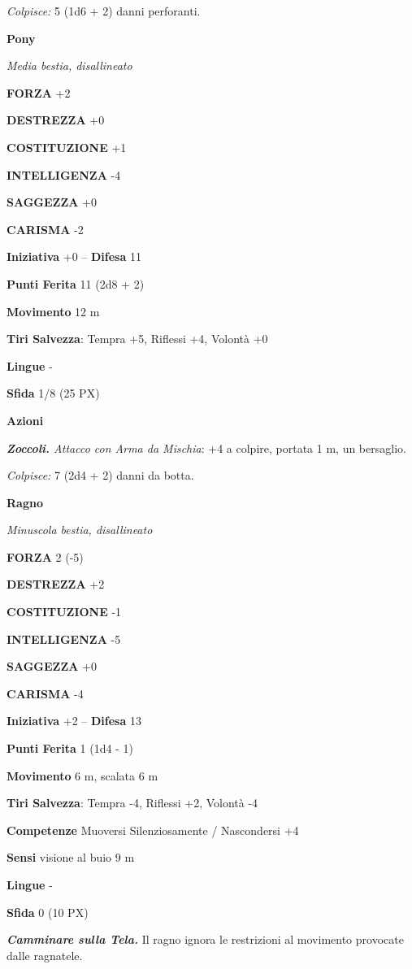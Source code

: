 \begin{multicols}{2}
	\textit{Colpisce:} 5 (1d6 + 2) danni perforanti.


	\medskip\textbf{Pony}

	\textit{Media bestia, disallineato}

	\textbf{FORZA} +2

	\textbf{DESTREZZA} +0

	\textbf{COSTITUZIONE} +1

	\textbf{INTELLIGENZA} -4

	\textbf{SAGGEZZA} +0

	\textbf{CARISMA} -2

	\textbf{Iniziativa} +0 -- \textbf{Difesa} 11

	\textbf{Punti Ferita} 11 (2d8 + 2)

	\textbf{Movimento} 12 m

	\textbf{Tiri Salvezza}: Tempra +5, Riflessi +4, Volontà +0

	\textbf{Lingue} -

	\textbf{Sfida} 1/8 (25 PX)

	\textbf{Azioni}

	\textit{\textbf{Zoccoli.} Attacco con Arma da Mischia}: +4 a colpire, portata 1 m, un bersaglio.

	\textit{Colpisce:} 7 (2d4 + 2) danni da botta.

	\medskip\textbf{Ragno}

	\textit{Minuscola bestia, disallineato}

	\textbf{FORZA} 2 (-5)

	\textbf{DESTREZZA} +2

	\textbf{COSTITUZIONE} -1

	\textbf{INTELLIGENZA} -5

	\textbf{SAGGEZZA} +0

	\textbf{CARISMA} -4

	\textbf{Iniziativa} +2 -- \textbf{Difesa} 13

	\textbf{Punti Ferita} 1 (1d4 - 1)

	\textbf{Movimento} 6 m, scalata 6 m

	\textbf{Tiri Salvezza}: Tempra -4, Riflessi +2, Volontà -4

	\textbf{Competenze} Muoversi Silenziosamente / Nascondersi +4

	\textbf{Sensi} visione al buio 9 m

	\textbf{Lingue} -

	\textbf{Sfida} 0 (10 PX)

	\textit{\textbf{Camminare sulla Tela.}} Il ragno ignora le restrizioni al movimento provocate dalle ragnatele.


\end{multicols}

